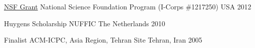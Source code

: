 

\begin{cvhonors}

  \cvhonor
    {\href{https://www.nsf.gov/awardsearch/showAward?AWD_ID=1217250}{NSF Grant}} %
    {National Science Foundation Program (I-Corps \#1217250)} %
    {USA} %
    {2012} %

  \cvhonor
    {Huygens Scholarship} %
    {NUFFIC} %
    {The Netherlands} %
    {2010} %

  \cvhonor
    {Finalist} %
    {ACM-ICPC, Asia Region, Tehran Site} %
    {Tehran, Iran} %
    {2005} %

\end{cvhonors}
